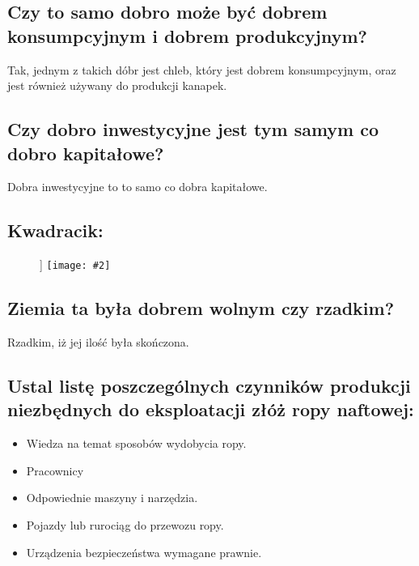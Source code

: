 \documentclass[a4paper,12pt]{article}
\newcommand{\obrazek}[2]{
	\begin{figure}[h]]
		\centering
		\texttt{[image: \#2]}
	\end{figure}
}
\begin{document}
\subsection{Czy to samo dobro może być dobrem konsumpcyjnym i dobrem produkcyjnym?}

Tak, jednym z takich dóbr jest chleb, który jest dobrem konsumpcyjnym, oraz jest również używany do produkcji kanapek. 

\subsection{Czy dobro inwestycyjne jest tym samym co dobro kapitałowe?}

Dobra inwestycyjne to to samo co dobra kapitałowe.

\subsection{Kwadracik:}

\obrazek{0.5}{kwadrat.png}

\subsection{}
\subsection{}
\subsection{}
\subsection{Ziemia ta była dobrem wolnym czy rzadkim?}

Rzadkim, iż jej ilość była skończona.

\subsection{Ustal listę poszczególnych czynników produkcji niezbędnych do eksploatacji złóż ropy naftowej:}
\begin{itemize}
	\item Wiedza na temat sposobów wydobycia ropy.
	\item Pracownicy
	\item Odpowiednie maszyny i narzędzia.
	\item Pojazdy lub rurociąg do przewozu ropy.
	\item Urządzenia bezpieczeństwa wymagane prawnie.
\end{itemize}
\end{document}
